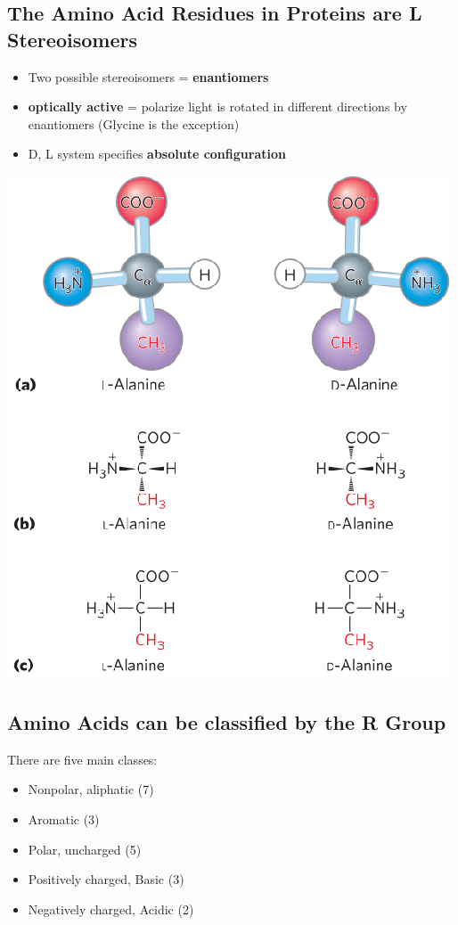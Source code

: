 \documentclass[10pt]{article}
\begin{document}
\subsection*{The Amino Acid Residues in Proteins are L Stereoisomers}
\begin{itemize}
    \item Two possible stereoisomers = \textbf{enantiomers}
    \item \textbf{optically active} = polarize light is rotated in different directions by enantiomers (Glycine is the exception)
    \item D, L system specifies \textbf{absolute configuration}
\end{itemize}
\begin{center}
    \includegraphics[scale=0.75]{L1_6.png}
\end{center}
\subsection*{Amino Acids can be classified by the R Group}
There are five main classes:
\begin{itemize}
    \item Nonpolar, aliphatic (7)
    \item Aromatic (3)
    \item Polar, uncharged (5)
    \item Positively charged, Basic (3)
    \item Negatively charged, Acidic (2)
\end{itemize}
\end{document}
